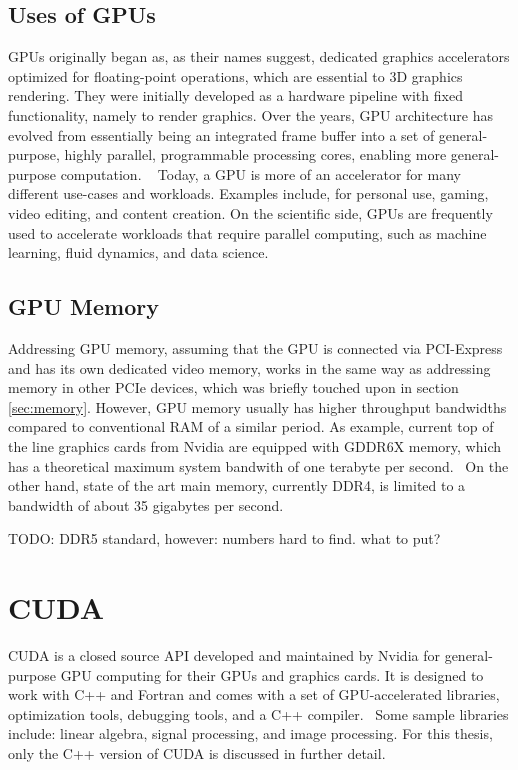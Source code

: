 \subsection{Uses of GPUs}

GPUs originally began as, as their names suggest, dedicated graphics accelerators optimized for floating-point operations, which are essential to 3D graphics rendering. They were initially developed as a hardware pipeline with fixed functionality, namely to render graphics. Over the years, GPU architecture has evolved from essentially being an integrated frame buffer into a set of general-purpose, highly parallel, programmable processing cores, enabling more general-purpose computation. ~\parencite{mcclanahan_history_2010} Today, a GPU is more of an accelerator for many different use-cases and workloads. Examples include, for personal use, gaming, video editing, and content creation. \cite{intel_what_nodate} On the scientific side, GPUs are frequently used to accelerate workloads that require parallel computing, such as machine learning, fluid dynamics, and data science. \cite{nvidia_cuda_2017}


\subsection{GPU Memory}
Addressing GPU memory, assuming that the GPU is connected via PCI-Express and has its own dedicated video memory, works in the same way as addressing memory in other PCIe devices, which was briefly touched upon in section \ref{sec:memory}. However, GPU memory usually has higher throughput bandwidths compared to conventional RAM of a similar period. As example, current top of the line graphics cards from Nvidia are equipped with GDDR6X memory, which has a theoretical maximum system bandwith of one terabyte per second.~\cite{nvidia_nvidia_nodate, micron_technology_inc_ram_nodate} On the other hand, state of the art main memory, currently DDR4, is limited to a bandwidth of about 35 gigabytes per second.~\cite{micron_technology_inc_ram_nodate}

TODO: DDR5 standard, however: numbers hard to find. what to put?


\section{CUDA}

CUDA is a closed source API developed and maintained by Nvidia for general-purpose GPU computing for their GPUs and graphics cards. It is designed to work with C++ and Fortran and comes with a set of GPU-accelerated libraries, optimization tools, debugging tools, and a C++ compiler.~\parencite{nvidia_cuda_2017} Some sample libraries include: linear algebra, signal processing, and image processing. \parencite{nvidia_cuda_2020} For this thesis, only the C++ version of CUDA is discussed in further detail.


